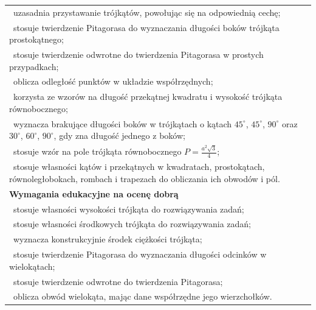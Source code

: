 \documentclass[12pt,a4paper]{article}
\begin{document}
\begin{longtable}{|p{16cm}|}
		\textbullet\ uzasadnia przystawanie trójkątów, powołując się na odpowiednią cechę; \\
		
		\textbullet\ stosuje twierdzenie Pitagorasa do wyznaczania długości boków trójkąta prostokątnego; \\
		
		\textbullet\ stosuje twierdzenie odwrotne do twierdzenia Pitagorasa w prostych przypadkach; \\
		
		\textbullet\ oblicza odległość punktów w układzie współrzędnych; \\
		
		\textbullet\ korzysta ze wzorów na długość przekątnej kwadratu i wysokość trójkąta równobocznego; \\
		
		\textbullet\ wyznacza brakujące długości boków w trójkątach o kątach $45^\circ$, $45^\circ$, $90^\circ$ oraz $30^\circ$, $60^\circ$, $90^\circ$, gdy zna długość jednego z boków; \\
		
		\textbullet\ stosuje wzór na pole trójkąta równobocznego $P=\frac{a^2\sqrt{3}}{4}$; \\
		
		\textbullet\ stosuje własności kątów i przekątnych w kwadratach, prostokątach, równoległobokach, rombach i trapezach do obliczania ich obwodów i pól. \\ \hline
		
		\textbf{Wymagania edukacyjne na ocenę dobrą} \\ \hline
		
		\textbullet\ stosuje własności wysokości trójkąta do rozwiązywania zadań; \\
		
		\textbullet\ stosuje własności środkowych trójkąta do rozwiązywania zadań; \\
		
		\textbullet\ wyznacza konstrukcyjnie środek ciężkości trójkąta; \\
		
		\textbullet\ stosuje twierdzenie Pitagorasa do wyznaczania długości odcinków w wielokątach; \\
		
		\textbullet\ stosuje twierdzenie odwrotne do twierdzenia Pitagorasa; \\
		
		\textbullet\ oblicza obwód wielokąta, mając dane współrzędne jego wierzchołków. \\ \hline
		

\end{longtable}
\end{document}
